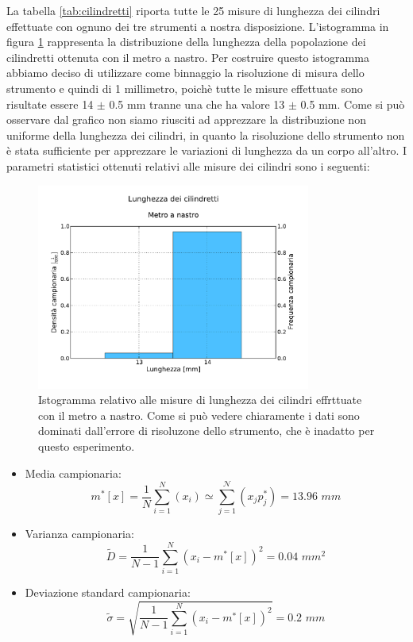 La tabella \ref{tab:cilindretti} riporta tutte le 25 misure di
lunghezza dei cilindri effettuate con ognuno dei tre strumenti a nostra
disposizione. L'istogramma in figura \ref{fig:metro} rappresenta la distribuzione della lunghezza della
popolazione dei cilindretti ottenuta con il metro a nastro. Per costruire
questo istogramma abbiamo deciso di utilizzare come binnaggio la risoluzione
di misura dello strumento e quindi di 1 millimetro, poichè tutte le misure
effettuate sono risultate essere 14 $\pm$ 0.5 mm tranne una che ha valore
13 $\pm$ 0.5 mm. Come si può osservare dal grafico non siamo riusciti ad
apprezzare la distribuzione non uniforme della lunghezza dei cilindri,
in quanto la risoluzione dello strumento non è stata sufficiente per
apprezzare le variazioni di lunghezza da un corpo all'altro.
I parametri statistici ottenuti relativi alle misure dei cilindri sono
i seguenti:

\begin{figure}
	\centering
	\includegraphics[width=90mm]{grafici/Cilindretti_metro.pdf}
	\caption{Istogramma relativo alle misure di lunghezza dei cilindri effrttuate con il
        metro a nastro. Come si può vedere chiaramente i dati sono dominati dall'errore di
        risoluzone dello strumento, che è inadatto per questo esperimento.}
	\label{fig:metro}
\end{figure}

\begin{itemize}
    \item{Media campionaria:}
        \begin{equation}
        m^*[x] = \frac{1}{N} \sum_{i=1}^{N} (x_i) \simeq \sum_{j=1}^{\mathcal{N}} (x_j p_j^*) = 13.96\,\,mm 
        \end{equation}

    \item{Varianza campionaria:}
        \begin{equation}
        \tilde{D} = \frac{1}{N - 1} \sum_{i=1}^{N} (x_i - m^*[x])^2 = 0.04\,\,mm^2
        \end{equation}

    \item{Deviazione standard campionaria:}
        \begin{equation}
        \tilde{\sigma} = \sqrt{\frac{1}{N - 1} \sum_{i=1}^{N} (x_i - m^*[x])^2} = 0.2\,\,mm
        \end{equation}
\end{itemize}

